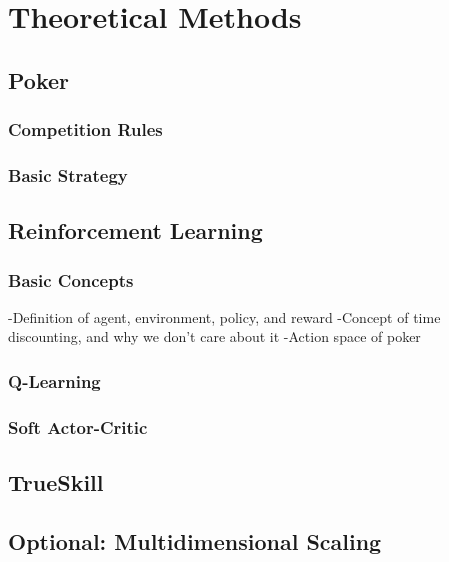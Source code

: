 \chapter{Theoretical Methods}


\section{Poker}

\subsection{Competition Rules}

\subsection{Basic Strategy}

\section{Reinforcement Learning}
\subsection{Basic Concepts}
-Definition of agent, environment, policy, and reward
-Concept of time discounting, and why we don't care about it
-Action space of poker

\subsection{Q-Learning}

\subsection{Soft Actor-Critic}


\section{TrueSkill}


\section{Optional: Multidimensional Scaling}